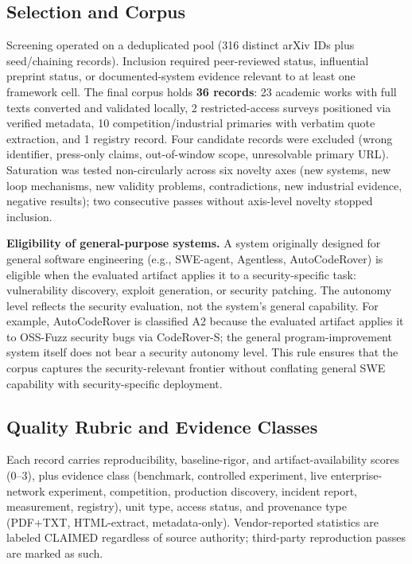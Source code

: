 \documentclass[conference,compsoc]{IEEEtran}
\begin{document}


\subsection{Selection and Corpus}
Screening operated on a deduplicated pool (316 distinct arXiv IDs plus seed/chaining records).
Inclusion required peer-reviewed status, influential preprint status, or documented-system
evidence relevant to at least one framework cell. The final corpus holds \textbf{36 records}:
23 academic works with full texts converted and validated locally, 2 restricted-access
surveys positioned via verified metadata, 10 competition/industrial primaries with verbatim
quote extraction, and 1 registry record. Four candidate records were excluded (wrong
identifier, press-only claims, out-of-window scope, unresolvable primary URL). Saturation was
tested non-circularly across six novelty axes (new systems, new loop mechanisms, new validity
problems, contradictions, new industrial evidence, negative results); two consecutive passes
without axis-level novelty stopped inclusion.

\textbf{Eligibility of general-purpose systems.} A system originally designed for general
software engineering (e.g., SWE-agent, Agentless, AutoCodeRover) is eligible when the
evaluated artifact applies it to a security-specific task: vulnerability discovery, exploit
generation, or security patching. The autonomy level reflects the security evaluation, not
the system's general capability. For example, AutoCodeRover is classified A2 because the
evaluated artifact applies it to OSS-Fuzz security bugs via CodeRover-S; the general
program-improvement system itself does not bear a security autonomy level. This rule ensures
that the corpus captures the security-relevant frontier without conflating general SWE
capability with security-specific deployment.

\subsection{Quality Rubric and Evidence Classes}
Each record carries reproducibility, baseline-rigor, and artifact-availability scores (0--3),
plus evidence class (benchmark, controlled experiment, live enterprise-network experiment,
competition, production discovery, incident report, measurement, registry), unit type, access
status, and provenance type (PDF+TXT, HTML-extract, metadata-only). Vendor-reported statistics
are labeled CLAIMED regardless of source authority; third-party reproduction passes are marked
as such.
\end{document}
